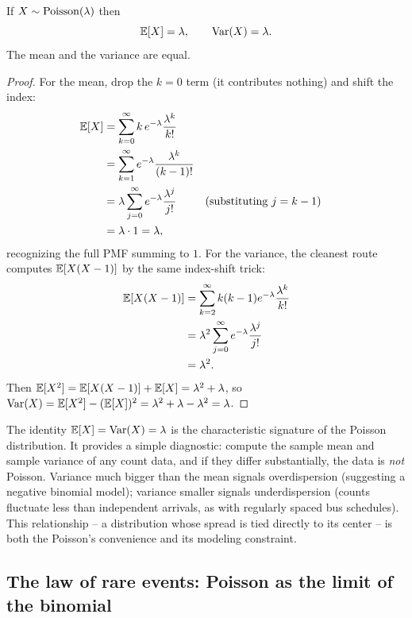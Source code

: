 \begin{proposition}
\label{ch07:pois-mv}
If $X \sim \operatorname{Poisson}(\lambda)$ then
\[
  \operatorname{\mathbb{E}}[X] = \lambda, \qquad \operatorname{Var}(X) = \lambda.
\]
The mean and the variance are equal.
\end{proposition}

\begin{proof}
For the mean, drop the $k=0$ term (it contributes nothing) and shift the index:
\begin{align*}
  \operatorname{\mathbb{E}}[X] &= \sum_{k=0}^{\infty} k\, e^{-\lambda}\frac{\lambda^k}{k!} \\
        &= \sum_{k=1}^{\infty} e^{-\lambda}\frac{\lambda^k}{(k-1)!} \\
        &= \lambda \sum_{j=0}^{\infty} e^{-\lambda}\frac{\lambda^{j}}{j!} &&\text{(substituting } j = k-1\text{)} \\
        &= \lambda \cdot 1 = \lambda,
\end{align*}
recognizing the full PMF summing to $1$. For the
variance, the cleanest route computes $\operatorname{\mathbb{E}}[X(X-1)]$ by the same index-shift trick:
\begin{align*}
  \operatorname{\mathbb{E}}[X(X-1)] &= \sum_{k=2}^{\infty} k(k-1) e^{-\lambda}\frac{\lambda^k}{k!} \\
  &= \lambda^2 \sum_{j=0}^{\infty} e^{-\lambda}\frac{\lambda^{j}}{j!} \\
  &= \lambda^2.
\end{align*}
Then $\operatorname{\mathbb{E}}[X^2] = \operatorname{\mathbb{E}}[X(X-1)] + \operatorname{\mathbb{E}}[X] = \lambda^2 + \lambda$, so
$\operatorname{Var}(X) = \operatorname{\mathbb{E}}[X^2] - (\operatorname{\mathbb{E}}[X])^2 = \lambda^2 + \lambda - \lambda^2 = \lambda$.
\end{proof}

\begin{aestheticbox}
The identity $\operatorname{\mathbb{E}}[X] = \operatorname{Var}(X) = \lambda$ is the characteristic signature of the
Poisson distribution. It provides a simple diagnostic: compute the sample mean and
sample variance of any count data, and if they differ substantially, the data is
\emph{not} Poisson. Variance much bigger than the mean signals overdispersion
(suggesting a negative binomial model); variance smaller signals underdispersion
(counts fluctuate less than independent arrivals, as with regularly spaced bus
schedules). This relationship -- a distribution whose spread is tied directly to its
center -- is both the Poisson's convenience and its modeling constraint.
\end{aestheticbox}

\subsection{The law of rare events: Poisson as the limit of the binomial}
\label{ch07:poisson-limit}

